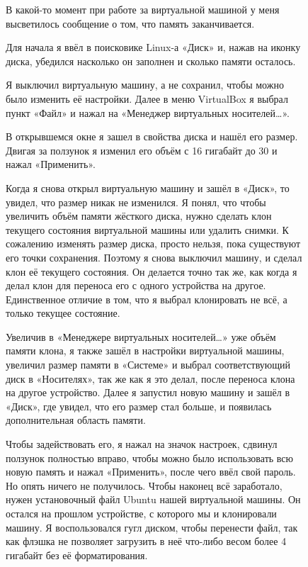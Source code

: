 \begin{figure}
\quad В какой-то момент при работе за виртуальной машиной у меня высветилось сообщение о том, что память заканчивается.
\end{figure}

\begin{figure}
\quad Для начала я ввёл в поисковике Linux-а «Диск» и, нажав на иконку диска, убедился насколько он заполнен и сколько памяти осталось.
\end{figure}

\begin{figure}
\quad Я выключил виртуальную машину, а не сохранил, чтобы можно было изменить её настройки. Далее в меню VirtualBox я выбрал пункт «Файл» и нажал на «Менеджер виртуальных носителей…».
\end{figure}

\begin{figure}
\quad В открывшемся окне я зашел в свойства диска и нашёл его размер. Двигая за ползунок я изменил его объём с 16 гигабайт до 30 и нажал «Применить».
\end{figure}

\begin{figure}
\quad Когда я снова открыл виртуальную машину и зашёл в «Диск», то увидел, что размер никак не изменился. Я понял, что чтобы увеличить объём памяти жёсткого диска, нужно сделать клон текущего состояния виртуальной машины или удалить снимки. К сожалению изменять размер диска, просто нельзя, пока существуют его точки сохранения. Поэтому я снова выключил машину, и сделал клон её текущего состояния. Он делается точно так же, как когда я делал клон для переноса его с одного устройства на другое. Единственное отличие в том, что я выбрал клонировать не всё, а только текущее состояние.
\end{figure}

\begin{figure}
\quad Увеличив в «Менеджере виртуальных носителей…» уже объём памяти клона, я также зашёл в настройки виртуальной машины, увеличил размер памяти в «Системе» и выбрал соответствующий диск в «Носителях», так же как я это делал, после переноса клона на другое устройство. Далее я запустил новую машину и зашёл в «Диск», где увидел, что его размер стал больше, и появилась дополнительная область памяти.
\end{figure}

\begin{figure}
\quad Чтобы задействовать его, я нажал на значок настроек, сдвинул ползунок полностью вправо, чтобы можно было использовать всю новую память и нажал «Применить», после чего ввёл свой пароль. Но опять ничего не получилось. Чтобы наконец всё заработало, нужен установочный файл Ubuntu нашей виртуальной машины. Он остался на прошлом устройстве, с которого мы и клонировали машину. Я воспользовался гугл диском, чтобы перенести файл, так как флэшка не позволяет загрузить в неё что-либо весом более 4 гигабайт без её форматирования.
\end{figure}
